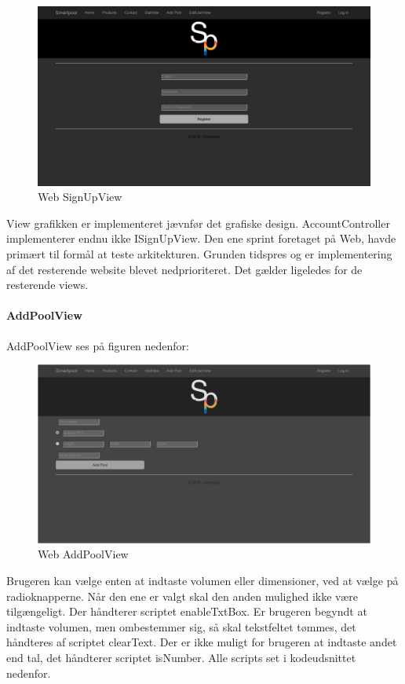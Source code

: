 \begin{figure}
	\centering
	\includegraphics[width=1.0\linewidth]{figs/implementering/web_signupview}
	\caption{Web SignUpView}
	\label{fig:websignupview}
\end{figure}

View grafikken er implementeret jævnfør det grafiske design. AccountController implementerer endnu ikke ISignUpView. Den ene sprint foretaget på Web, havde primært til formål at teste arkitekturen. Grunden tidspres og er implementering af det resterende website blevet nedprioriteret. Det gælder ligeledes for de resterende views.

\paragraph{AddPoolView}
AddPoolView ses på figuren nedenfor:

\begin{figure}
	\centering
	\includegraphics[width=1.0\linewidth]{figs/implementering/web_addpoolview}
	\caption{Web AddPoolView}
	\label{fig:webaddpoolview}
\end{figure}

Brugeren kan vælge enten at indtaste volumen eller dimensioner, ved at vælge på radioknapperne. Når den ene er valgt skal den anden mulighed ikke være tilgængeligt. Der håndterer scriptet enableTxtBox. Er brugeren begyndt at indtaste volumen, men ombestemmer sig, så skal tekstfeltet tømmes, det håndteres af scriptet clearText. Der er ikke muligt for brugeren at indtaste andet end tal, det håndterer scriptet isNumber. Alle scripts set i kodeudsnittet nedenfor.

